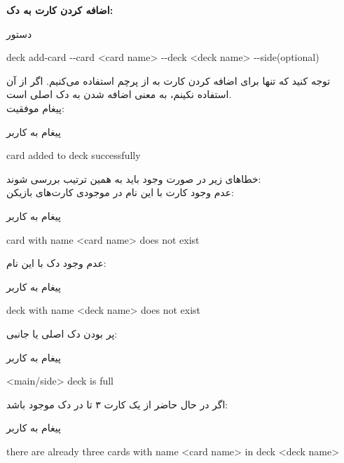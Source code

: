 \documentclass[]{article}
\begin{document}
\vspace{.5cm}
\textbf{اضافه کردن کارت به دک:}
\begin{mybox}[colback=yellow]{دستور}
	\begin{latin}	
		deck add-card -{}-card <card name> -{}-deck <deck name> 
		-{}-side(optional)
	\end{latin}
\end{mybox}
توجه کنید که تنها برای اضافه کردن کارت به  از پرچم  
استفاده می‌کنیم. اگر از آن استفاده نکینم، به معنی اضافه شدن به دک اصلی است.
\\
پیغام موفقیت:
\begin{mybox}[colback=yellow]{پیغام به کاربر}
	\begin{latin}	
		card added to deck successfully
	\end{latin}
\end{mybox}
خطاهای زیر در صورت وجود باید به همین ترتیب بررسی شوند:
\\
عدم وجود کارت با این نام در موجودی کارت‌های بازیکن:
\begin{mybox}[colback=yellow]{پیغام به کاربر}
	\begin{latin}	
		card with name <card name> does not exist
	\end{latin}
\end{mybox}
عدم وجود دک با این نام:
\begin{mybox}[colback=yellow]{پیغام به کاربر}
	\begin{latin}	
		deck with name <deck name> does not exist
	\end{latin}
\end{mybox}
پر بودن دک اصلی یا جانبی:
\begin{mybox}[colback=yellow]{پیغام به کاربر}
	\begin{latin}	
		<main/side> deck is full
	\end{latin}
\end{mybox}
اگر در حال حاضر از یک کارت ۳ تا در دک موجود باشد:
\begin{mybox}[colback=yellow]{پیغام به کاربر}
	\begin{latin}	
		there are already three cards with name <card name> in deck <deck name>
	\end{latin}
\end{mybox}
\end{document}

